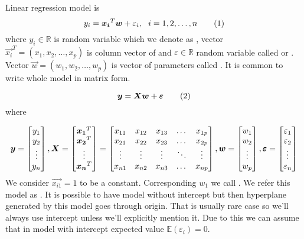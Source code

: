 \begin{definition}\label{definition:lr_model}
    Linear regression model is 
    \[ 
        y_i = \vec{x_i}^T\vec{w} + \varepsilon_i\\, \ \  i = 1,2,\ldots,n \numberthis
    \]
where $y_i \in \mathbb{R}$ is random variable which we denote as , vector $\vec{x_i}^T = (x_1, x_2, \ldots, x_p)$ is column vector of  and $\varepsilon \in \mathbb{R}$ random variable called  or . Vector $\vec{w} = (w_1, w_2, \ldots, w_p)$ is vector of parameters called  . It is common to write whole model in matrix form. 

\[ 
    \vec{y} = \vec{X}\vec{w} + \vec{\varepsilon}    \numberthis
\] where

\[ 
\vec{y} = \begin{bmatrix}
    y_{1} \\
    y_{2} \\
    \vdots \\
    y_{n}
  \end{bmatrix}\\,
 \vec{X} = \begin{bmatrix}
    \vec{x_1}^T \\
    \vec{x_2}^T \\
    \vdots \\
    \vec{x_n}^T
\end{bmatrix}
=
\begin{bmatrix}
    x_{11} & x_{12} & x_{13} & \dots  & x_{1p} \\
    x_{21} & x_{22} & x_{23} & \dots  & x_{2p} \\
    \vdots & \vdots & \vdots & \ddots & \vdots \\
    x_{n1} & x_{n2} & x_{n3} & \dots  & x_{np}
\end{bmatrix}\\,
\vec{w} = \begin{bmatrix}
    w_{1} \\
    w_{2} \\
    \vdots \\
    w_{p}
  \end{bmatrix}\\,
  \vec{\varepsilon} = \begin{bmatrix}
    \varepsilon_{1} \\
    \varepsilon_{2} \\
    \vdots \\
    \varepsilon_{n}
  \end{bmatrix}
\]
We consider $\vec{x_{i1}} = 1$ to be a constant. Corresponding $w_{1}$ we call . We refer this model as . It is possible to have model without intercept but then hyperplane generated by this model goes through origin. That is usually rare case so we'll always use intercept unless we'll explicitly mention it. Due to this we can assume that in model with intercept expected value  $\mathbb{E}(\varepsilon_i) = 0$.
\end{definition}


